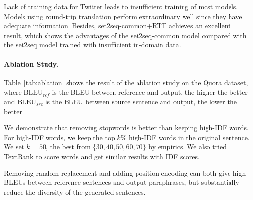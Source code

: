 Lack of training data for Twitter leads to insufficient training of most models.
Models using round-trip translation perform extraordinary well since they have 
adequate information. Besides, set2seq-common+RTT achieves an excellent result, 
which shows the advantages of the set2seq-common model compared with the 
set2seq model trained with insufficient in-domain data.

\paragraph{Ablation Study. }

Table~\ref{tab:ablation} shows the result of the ablation study on the Quora dataset, where $\text{BLEU}_{ref}$ is the BLEU between reference and output, the higher the better and $\text{BLEU}_{src}$ is the BLEU between source sentence and output, the lower the better. 

We demonstrate that removing stopwords is better than keeping high-IDF words. 
For high-IDF words, we keep the top $k\%$ high-IDF words in the original 
sentence.  We set $k=50$, the best from $\{30, 40, 50, 60, 70\}$
by empirics. We also tried TextRank \cite{mihalcea2004textrank} to score words and get similar results with IDF scores. 

Removing random replacement and adding position encoding can both give
high BLEUs between reference sentences and output paraphrases, 
but substantially reduce the diversity of the generated sentences. 

